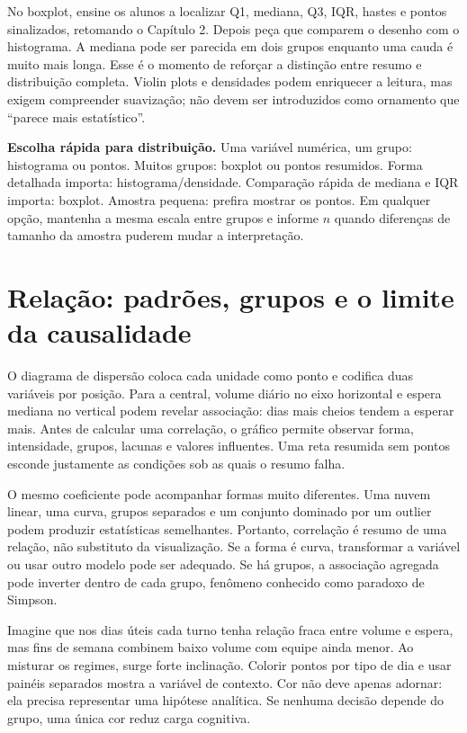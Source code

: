 No boxplot, ensine os alunos a localizar Q1, mediana, Q3, IQR, hastes e pontos sinalizados, retomando o Capítulo 2. Depois peça que comparem o desenho com o histograma. A mediana pode ser parecida em dois grupos enquanto uma cauda é muito mais longa. Esse é o momento de reforçar a distinção entre resumo e distribuição completa. Violin plots e densidades podem enriquecer a leitura, mas exigem compreender suavização; não devem ser introduzidos como ornamento que ``parece mais estatístico''.

\begin{GuidedBox}
\textbf{Escolha rápida para distribuição.} Uma variável numérica, um grupo: histograma ou pontos. Muitos grupos: boxplot ou pontos resumidos. Forma detalhada importa: histograma/densidade. Comparação rápida de mediana e IQR importa: boxplot. Amostra pequena: prefira mostrar os pontos. Em qualquer opção, mantenha a mesma escala entre grupos e informe $n$ quando diferenças de tamanho da amostra puderem mudar a interpretação.
\end{GuidedBox}


\section{Relação: padrões, grupos e o limite da causalidade}

O diagrama de dispersão coloca cada unidade como ponto e codifica duas variáveis por posição. Para a central, volume diário no eixo horizontal e espera mediana no vertical podem revelar associação: dias mais cheios tendem a esperar mais. Antes de calcular uma correlação, o gráfico permite observar forma, intensidade, grupos, lacunas e valores influentes. Uma reta resumida sem pontos esconde justamente as condições sob as quais o resumo falha.

O mesmo coeficiente pode acompanhar formas muito diferentes. Uma nuvem linear, uma curva, grupos separados e um conjunto dominado por um outlier podem produzir estatísticas semelhantes. Portanto, correlação é resumo de uma relação, não substituto da visualização. Se a forma é curva, transformar a variável ou usar outro modelo pode ser adequado. Se há grupos, a associação agregada pode inverter dentro de cada grupo, fenômeno conhecido como paradoxo de Simpson.

Imagine que nos dias úteis cada turno tenha relação fraca entre volume e espera, mas fins de semana combinem baixo volume com equipe ainda menor. Ao misturar os regimes, surge forte inclinação. Colorir pontos por tipo de dia e usar painéis separados mostra a variável de contexto. Cor não deve apenas adornar: ela precisa representar uma hipótese analítica. Se nenhuma decisão depende do grupo, uma única cor reduz carga cognitiva.

